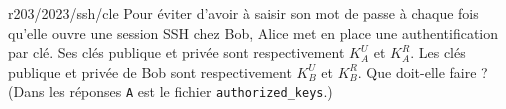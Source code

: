 \begin{question}{r203/2023/ssh/cle}
  Pour éviter d'avoir à saisir son mot de passe à chaque fois qu'elle
  ouvre une session SSH chez Bob, Alice met en place une
  authentification par clé. Ses clés publique et privée sont
  respectivement $K^{U}_A$ et $K^{R}_A$. Les clés publique et privée
  de Bob sont respectivement $K^{U}_B$ et $K^{R}_B$. Que doit-elle
  faire ? (Dans les réponses \texttt{A} est le fichier
  \texttt{authorized\_keys}.)
  \begin{reponses}[2]
  \end{reponses}
\end{question}

